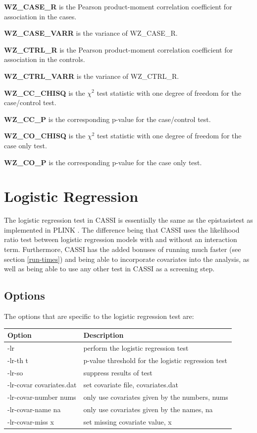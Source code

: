\documentclass[a4paper,12pt]{article}
\begin{document}
{\bf WZ\_CASE\_R} is the Pearson product-moment correlation coefficient for association in the cases. 

{\bf WZ\_CASE\_VARR} is the variance of WZ\_CASE\_R.

{\bf WZ\_CTRL\_R} is the Pearson product-moment correlation coefficient for association in the controls. 

{\bf WZ\_CTRL\_VARR} is the variance of WZ\_CTRL\_R.

{\bf WZ\_CC\_CHISQ} is the $\chi^2$ test statistic with one degree of freedom for the case/control test. 

{\bf WZ\_CC\_P} is the corresponding p-value for the case/control test. 

{\bf WZ\_CO\_CHISQ} is the $\chi^2$ test statistic with one degree of freedom for the case only test. 

{\bf WZ\_CO\_P} is the corresponding p-value for the case only test. 




\section{Logistic Regression}
\label{logistic-regression}

The logistic regression test in CASSI is essentially the same as the epistasistest as implemented in PLINK \citet{purcell:etal:07}. The difference being that CASSI uses the likelihood ratio test between logistic regression models with and without an interaction term. Furthermore, CASSI has the added bonuses of running much faster (see  section \ref{run-times}) and being able to incorporate covariates into the analysis, as well as being able to use any other test in CASSI as a screening step. 
\subsection{Options}
\label{lr-options}

The options that are specific to the logistic regression test are: 

{\begin{center}\begin{tabular}{ll}
Option  & Description\\
\hline
-lr  & perform the logistic regression test\\
-lr-th t  & p-value threshold for the logistic regression test\\
-lr-so  & suppress results of test\\
-lr-covar covariates.dat  & set covariate file, covariates.dat\\
-lr-covar-number nums  & only use covariates given by the numbers, nums\\
-lr-covar-name na  & only use covariates given by the names, na\\
-lr-covar-miss x  & set missing covariate value, x\\
\end{tabular}\end{center}}
\end{document}
